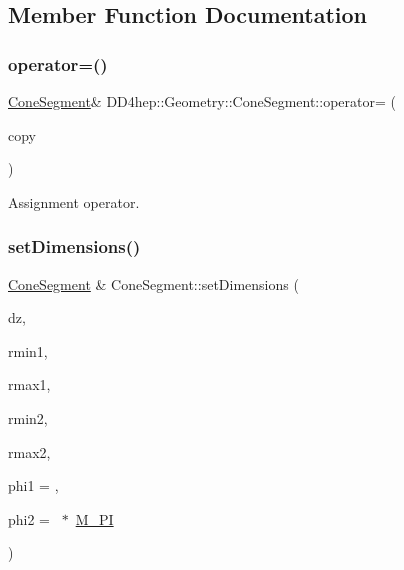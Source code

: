 \subsection{Member Function Documentation}
\hypertarget{class_d_d4hep_1_1_geometry_1_1_cone_segment_ae1f716f53de5892b6ab63e1b74c9375a}{}\label{class_d_d4hep_1_1_geometry_1_1_cone_segment_ae1f716f53de5892b6ab63e1b74c9375a} 
\subsubsection{\texorpdfstring{operator=()}{operator=()}}
{\footnotesize\ttfamily \hyperlink{class_d_d4hep_1_1_geometry_1_1_cone_segment}{Cone\+Segment}\& D\+D4hep\+::\+Geometry\+::\+Cone\+Segment\+::operator= (\begin{DoxyParamCaption}\item[{const \hyperlink{class_d_d4hep_1_1_geometry_1_1_cone_segment}{Cone\+Segment} \&}]{copy }\end{DoxyParamCaption})\hspace{0.3cm}{\ttfamily [default]}}



Assignment operator. 

\hypertarget{class_d_d4hep_1_1_geometry_1_1_cone_segment_a1c5563e5b474583f16caf12a4d3f7834}{}\label{class_d_d4hep_1_1_geometry_1_1_cone_segment_a1c5563e5b474583f16caf12a4d3f7834} 
\subsubsection{\texorpdfstring{set\+Dimensions()}{setDimensions()}}
{\footnotesize\ttfamily \hyperlink{class_d_d4hep_1_1_geometry_1_1_cone_segment}{Cone\+Segment} \& Cone\+Segment\+::set\+Dimensions (\begin{DoxyParamCaption}\item[{double}]{dz,  }\item[{double}]{rmin1,  }\item[{double}]{rmax1,  }\item[{double}]{rmin2,  }\item[{double}]{rmax2,  }\item[{double}]{phi1 = {},  }\item[{double}]{phi2 = {~$\ast$~\hyperlink{_x_m_l_elements_8h_ae71449b1cc6e6250b91f539153a7a0d3}{M\+\_\+\+PI}} }\end{DoxyParamCaption})}



